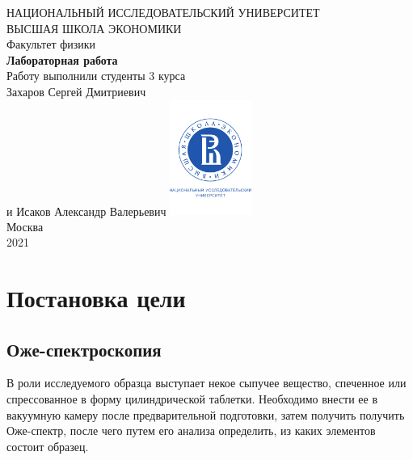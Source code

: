 \documentclass[a4paper, 12pt]{article}
\begin{document}
	\begin{titlepage}
		\begin{center}
			$$$$
			$$$$
			$$$$
			$$$$
			{\Large{НАЦИОНАЛЬНЫЙ ИССЛЕДОВАТЕЛЬСКИЙ УНИВЕРСИТЕТ}}\\
			\vspace{0.1cm}
			{\Large{ВЫСШАЯ ШКОЛА ЭКОНОМИКИ}}\\
			\vspace{0.25cm}
			{\large{Факультет физики}}\\
			\vspace{5.5cm}
			{\Huge\textbf{{Лабораторная работа}}}\\%
			\vspace{1cm}
			{Работу выполнили студенты 3 курса}\\
			{Захаров Сергей Дмитриевич}\\
			{и Исаков Александр Валерьевич}
			\vfill
			\includegraphics[width = 0.2\textwidth]{HSElogo}\\
			\vfill
			Москва\\
			2021
		\end{center}
	\end{titlepage}
	
	\tableofcontents
	
	\newpage
	
	\section{Постановка цели}
	
	
	
	\subsection{Оже-спектроскопия}
	
	В роли исследуемого образца выступает некое сыпучее вещество, спеченное или спрессованное в форму цилиндрической таблетки. Необходимо внести ее в вакуумную камеру после предварительной подготовки, затем получить получить Оже-спектр, после чего путем его анализа определить, из каких элементов состоит образец.
	
\end{document}
